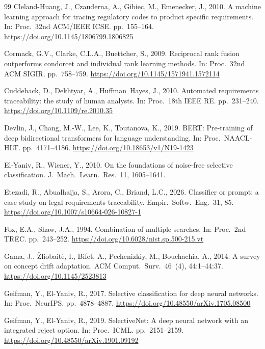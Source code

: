 \documentclass[smallextended,natbib]{svjour3}
\begin{document}
\begin{thebibliography}{99}
Cleland-Huang, J., Czauderna, A., Gibiec, M., Emenecker, J., 2010. A machine learning approach for tracing regulatory codes to product specific requirements. In: Proc.\ 32nd ACM/IEEE ICSE. pp.\ 155--164. \url{https://doi.org/10.1145/1806799.1806825}

Cormack, G.V., Clarke, C.L.A., Buettcher, S., 2009. Reciprocal rank fusion outperforms condorcet and individual rank learning methods. In: Proc.\ 32nd ACM SIGIR. pp.\ 758--759. \url{https://doi.org/10.1145/1571941.1572114}

Cuddeback, D., Dekhtyar, A., Huffman~Hayes, J., 2010. Automated requirements traceability: the study of human analysts. In: Proc.\ 18th IEEE RE. pp.\ 231--240. \url{https://doi.org/10.1109/re.2010.35}

Devlin, J., Chang, M.-W., Lee, K., Toutanova, K., 2019. BERT: Pre-training of deep bidirectional transformers for language understanding. In: Proc.\ NAACL-HLT. pp.\ 4171--4186. \url{https://doi.org/10.18653/v1/N19-1423}

El-Yaniv, R., Wiener, Y., 2010. On the foundations of noise-free selective classification. J.\ Mach.\ Learn.\ Res.\ 11, 1605--1641.

Etezadi, R., Abualhaija, S., Arora, C., Briand, L.C., 2026. Classifier or prompt: a case study on legal requirements traceability. Empir.\ Softw.\ Eng.\ 31, 85. \url{https://doi.org/10.1007/s10664-026-10827-1}

Fox, E.A., Shaw, J.A., 1994. Combination of multiple searches. In: Proc.\ 2nd TREC. pp.\ 243--252. \url{https://doi.org/10.6028/nist.sp.500-215.vt}

Gama, J., \v{Z}liobait\.{e}, I., Bifet, A., Pechenizkiy, M., Bouchachia, A., 2014. A survey on concept drift adaptation. ACM Comput.\ Surv.\ 46~(4), 44:1--44:37. \url{https://doi.org/10.1145/2523813}

Geifman, Y., El-Yaniv, R., 2017. Selective classification for deep neural networks. In: Proc.\ NeurIPS. pp.\ 4878--4887. \url{https://doi.org/10.48550/arXiv.1705.08500}

Geifman, Y., El-Yaniv, R., 2019. SelectiveNet: A deep neural network with an integrated reject option. In: Proc.\ ICML. pp.\ 2151--2159. \url{https://doi.org/10.48550/arXiv.1901.09192}


\end{thebibliography}
\end{document}
